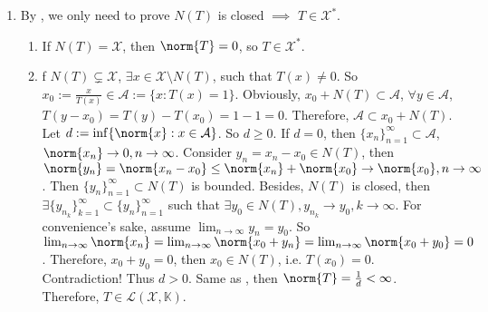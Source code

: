 \documentclass{ctexart}
\begin{document}
\begin{solution}
\begin{enumerate}
    \item
      By , we only need to prove \(N(T)\) is closed \(\implies\) \(T \in \mathcal{X}^*\). 
      \begin{enumerate}
        \item If \(N(T)=\mathcal{X}\), then \(\norm{T} =0\), so \(T \in \mathcal{X}^*\).
        \item f \(N(T) \subsetneq \mathcal{X}\), \(\exists x \in \mathcal{X} \setminus N(T)\), such that \(T(x) \neq 0\).
        So \(x_0:=\frac{x}{T(x)} \in \mathcal{A} := \{x: T(x) = 1\}\).
        Obviously, \(x_0+N(T) \subset \mathcal{A}\), \(\forall y \in \mathcal{A}\), \(T(y-x_0) = T(y) - T(x_0) = 1-1 = 0\).
        Therefore, \(\mathcal{A} \subset x_0 + N(T)\). Let \(d:= \inf\{\norm{x}: x \in \mathcal{A}\}\).
        So \(d \geq 0\). If \(d = 0\), then \(\{x_n\}_{n=1}^{\infty} \subset \mathcal{A}\), \(\norm{x_n} \to 0, n \to \infty\).
        Consider \(y_n = x_n - x_0 \in N(T)\), then \(\norm{y_n} = \norm{x_n - x_0} \leq \norm{x_n} + \norm{x_0} \to \norm{x_0}, n \to \infty\).
        Then \(\{y_n\}_{n=1}^{\infty} \subset N(T)\) is bounded. Besides, \(N(T)\) is closed, 
        then \(\exists \{y_{n_k}\}_{k=1}^{\infty} \subset \{y_n\}_{n=1}^{\infty}\) such that \(\exists y_0 \in N(T), y_{n_k} \to y_0, k \to \infty\).
        For convenience's sake, assume \(\lim_{n \to \infty} y_n = y_0\).
        So \(\lim_{n \to \infty} \norm{x_n} = \lim_{n \to \infty} \norm{x_0+y_n} = \lim_{n \to \infty} \norm{x_0+y_0} = 0\).
        Therefore, \(x_0+y_0 = 0\), then \(x_0 \in N(T)\), i.e. \(T(x_0) = 0\). Contradiction!
        Thus \(d > 0\). Same as , then \(\norm{T} = \frac{1}{d} < \infty\).
       Therefore, \(T \in \mathscr{L}(\mathcal{X}, \mathbb{K})\).
     \end{enumerate}
  \end{enumerate}
\end{solution}
\end{document}
